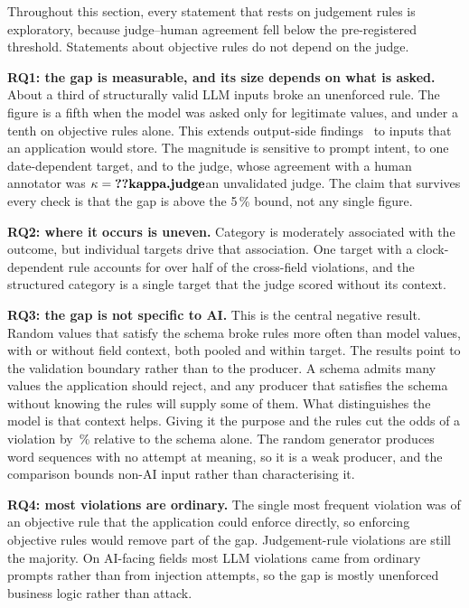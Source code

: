 \documentclass[conference]{IEEEtran}
\begin{document}
\ifjudgeweak Throughout this section, every statement that rests on judgement rules is exploratory,
because judge--human agreement fell below the pre-registered threshold. Statements about objective
rules do not depend on the judge.\fi

\textbf{RQ1: the gap is measurable, and its size depends on what is asked.} About a third of
structurally valid LLM inputs broke an unenforced rule. The figure is a fifth when the model was asked
only for legitimate values, and under a tenth on objective rules alone. This extends output-side
findings~\cite{li2026orderbench,singh2026sob,wrenn2026enterprise} to inputs that an application would
store. The magnitude is sensitive to prompt intent, to one date-dependent target, and to
\ifhumanlabels the judge, whose agreement with a human annotator was $\kappa=\R{kappa.judge}$\else an
unvalidated judge\fi. The claim that survives every check is that the gap is above the 5\,\% bound,
not any single figure.

\textbf{RQ2: where it occurs is uneven.} Category is moderately associated with the outcome, but
individual targets drive that association. One target with a clock-dependent rule accounts for over
half of the cross-field violations, and the structured category is a single target that the judge
scored without its context.

\textbf{RQ3: the gap is not specific to AI.} This is the central negative result. Random values that
satisfy the schema broke rules more often than model values, with or without field context, both pooled
and within target. The results point to the validation boundary rather than to the producer. A schema
admits many values the application should reject, and any producer that satisfies the schema without
knowing the rules will supply some of them. What distinguishes the model is that context helps. Giving
it the purpose and the rules cut the odds of a violation by \,\% relative to the
schema alone. The random generator produces word sequences with no attempt at meaning, so it is a weak
producer, and the comparison bounds non-AI input rather than characterising it.

\textbf{RQ4: most violations are ordinary.} The single most frequent violation was of an objective rule
that the application could enforce directly, so enforcing objective rules would remove part of the gap.
Judgement-rule violations are still the majority. On AI-facing fields most LLM violations came from
ordinary prompts rather than from injection attempts, so the gap is mostly unenforced business logic
rather than attack.
\end{document}
